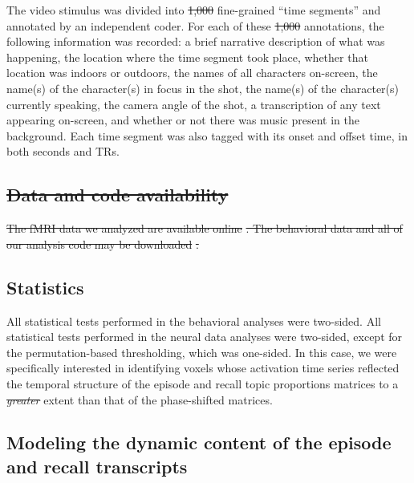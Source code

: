 \documentclass[10pt]{article}
\renewcommand{\includegraphics}[2][]{} %
\providecommand{\DIFaddtex}[1]{{\protect\color{blue}\uwave{#1}}} %
\providecommand{\DIFdeltex}[1]{{\protect\color{red}\sout{#1}}}                      %
\providecommand{\DIFaddbegin}{} %
\providecommand{\DIFaddend}{} %
\providecommand{\DIFdelbegin}{} %
\providecommand{\DIFdelend}{} %
\providecommand{\DIFadd}[1]{\texorpdfstring{\DIFaddtex{#1}}{#1}} %
\providecommand{\DIFdel}[1]{\texorpdfstring{\DIFdeltex{#1}}{}} %
\newcommand{\DIFscaledelfig}{0.5}
\newlength{\DIFdelgraphicswidth} %
\newlength{\DIFdelgraphicsheight} %
\newcommand{\DIFaddincludegraphics}[2][]{{\color{blue}\fbox{\DIFOincludegraphics[#1]{#2}}}} %
\newcommand{\DIFdelincludegraphics}[2][]{%
\sbox{\DIFdelgraphicsbox}{\DIFOincludegraphics[#1]{#2}}%
\settoboxwidth{\DIFdelgraphicswidth}{\DIFdelgraphicsbox} %
\settoboxtotalheight{\DIFdelgraphicsheight}{\DIFdelgraphicsbox} %
\scalebox{\DIFscaledelfig}{%
\parbox[b]{\DIFdelgraphicswidth}{\usebox{\DIFdelgraphicsbox}\\[-\baselineskip] \rule{\DIFdelgraphicswidth}{0em}}\llap{\resizebox{\DIFdelgraphicswidth}{\DIFdelgraphicsheight}{%
\setlength{\unitlength}{\DIFdelgraphicswidth}%
\begin{picture}(1,1)%
\thicklines\linethickness{2pt} %
{\color[rgb]{1,0,0}\put(0,0){\framebox(1,1){}}}%
{\color[rgb]{1,0,0}\put(0,0){\line( 1,1){1}}}%
{\color[rgb]{1,0,0}\put(0,1){\line(1,-1){1}}}%
\end{picture}%
}\hspace*{3pt}}} %
} %
\DeclareRobustCommand{\DIFaddbegin}{\DIFOaddbegin \let\includegraphics\DIFaddincludegraphics} %
\DeclareRobustCommand{\DIFaddend}{\DIFOaddend \let\includegraphics\DIFOincludegraphics} %
\DeclareRobustCommand{\DIFdelbegin}{\DIFOdelbegin \let\includegraphics\DIFdelincludegraphics} %
\DeclareRobustCommand{\DIFdelend}{\DIFOaddend \let\includegraphics\DIFOincludegraphics} %
\begin{document}
The video stimulus was divided into \DIFdelbegin \DIFdel{1,000 }\DIFdelend \DIFaddbegin \DIFadd{1000 }\DIFaddend fine-grained ``time segments'' and annotated by an independent coder.  For each of these \DIFdelbegin \DIFdel{1,000 }\DIFdelend \DIFaddbegin \DIFadd{1000 }\DIFaddend annotations, the following information was recorded: a brief narrative description of what was happening, the location where the time segment took place, whether that location was indoors or outdoors, the names of all characters on-screen, the name(s) of the character(s) in focus in the shot, the name(s) of the character(s) currently speaking, the camera angle of the shot, a transcription of any text appearing on-screen, and whether or not there was music present in the background.  Each time segment was also tagged with its onset and offset time, in both seconds and TRs.

\DIFdelbegin \subsection*{\DIFdel{Data and code availability}}
\DIFdel{The fMRI data we analyzed are available online }%
\DIFdel{.  The behavioral data and all of our analysis code may be downloaded }%
\DIFdel{.
}%

\DIFdelend \subsection*{Statistics}
All statistical tests performed in the behavioral analyses were two-sided.  All statistical tests performed in the neural data analyses were two-sided, except for the permutation-based thresholding, which was one-sided.  In this case, we were specifically interested in identifying voxels whose activation time series reflected the temporal structure of the episode and recall topic proportions matrices to a \DIFdelbegin \textit{\DIFdel{greater}} %
\DIFdelend \DIFaddbegin \DIFadd{greater }\DIFaddend extent than that of the phase-shifted matrices.

\subsection*{Modeling the dynamic content of the episode and recall transcripts}
\end{document}
